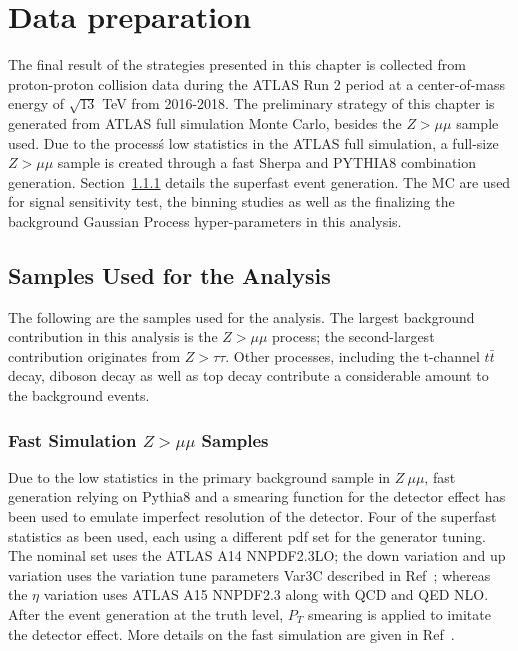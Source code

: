 \section{Data preparation}
The final result of the strategies presented in this chapter is collected from proton-proton collision data during the ATLAS Run 2 period at a center-of-mass energy of $\sqrt{13}$ TeV from 2016-2018. The preliminary strategy of this chapter is generated from ATLAS full simulation Monte Carlo, besides the $Z > \mu \mu $ sample used. Due to the process\'s low statistics in the ATLAS full simulation, a full-size $Z > \mu \mu$ sample is created through a fast Sherpa and PYTHIA8 combination
generation. Section~\ref{sec:fastsimulation} details the superfast event generation. The MC are used for signal sensitivity test, the binning studies as well as the finalizing the background Gaussian Process hyper-parameters in this analysis. 

\subsection{Samples Used for the Analysis}
The following are the samples used for the analysis. The largest background contribution in this analysis is the $Z > \mu\mu $ process; the second-largest contribution originates from $Z > \tau \tau$. Other processes, including the t-channel $t\bar{t}$ decay, diboson decay as well as top decay contribute a considerable amount to the background events.

\subsubsection{Fast Simulation $Z > \mu\mu$  Samples}
\label{sec:fastsimulation}
Due to the low statistics in the primary background sample in  $Z \> \mu \mu$, fast generation relying on Pythia8 and a smearing function for the detector effect has been used to emulate imperfect resolution of the detector. Four of the superfast statistics as been used, each using a different pdf set for the generator tuning. The nominal set uses the ATLAS A14 NNPDF2.3LO; the down variation and up variation uses the variation tune parameters Var3C described in Ref~\cite{ATL-PHYS-PUB-2014-021}; whereas the $\eta$ variation uses ATLAS A15 NNPDF2.3 along with QCD and QED NLO. After the event generation at the truth level, $P_{T}$ smearing is applied to imitate the detector effect. More details on the fast simulation are given in Ref~\cite{Artoni:2703492}.


